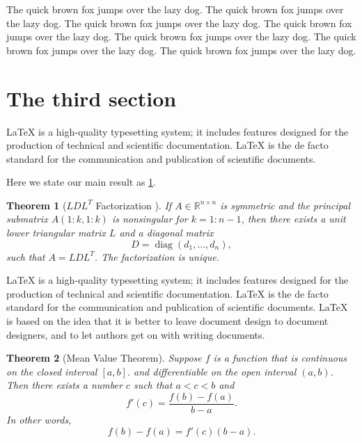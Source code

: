 \documentclass[openany,twoside,12pt]{book}
\theoremstyle{plain}
\newtheorem{theorem}{Theorem}[chapter]
\numberwithin{equation}{chapter}
\numberwithin{figure}{chapter}
\numberwithin{table}{chapter}
\begin{document}
The quick brown fox jumps over the lazy dog. The quick brown fox jumps over the lazy dog. The quick brown fox jumps over the lazy dog. The quick brown fox jumps over the lazy dog. The quick brown fox jumps over the lazy dog. The quick brown fox jumps over the lazy dog. The quick brown fox jumps over the lazy dog.


\section{The third section}
LaTeX is a high-quality typesetting system; it includes features designed for the production of technical and scientific documentation. LaTeX is the de facto standard for the communication and publication of scientific documents.

Here we state our main result as \ref{thm:bigthm}.

\begin{theorem}[$LDL^T$ Factorization \cite{GoVa2013}]\label{thm:bigthm}
  If $A \in \mathbb{R}^{n \times n}$ is symmetric and the principal
  submatrix $A(1:k,1:k)$ is nonsingular for $k=1:n-1$, then there
  exists a unit lower triangular matrix $L$ and a diagonal matrix
  \begin{equation*}
    D = \operatorname{diag}(d_1,\dots,d_n),  %
  \end{equation*}
  such that $A=LDL^T$. The factorization is unique.
\end{theorem}

LaTeX is a high-quality typesetting system; it includes features designed
for the production of technical and scientific documentation.
LaTeX is the de facto standard for the communication and publication of scientific documents.
LaTeX is based on the idea that it is better to leave document design to
document designers, and to let authors get on with writing documents.

\begin{theorem}[Mean Value Theorem]\label{thm:mvt}
  Suppose $f$ is a function that is continuous on the closed interval
  $[a,b]$.  and differentiable on the open interval $(a,b)$.
  Then there exists a number $c$ such that $a < c < b$ and
  \begin{equation*}
    f'(c) = \frac{f(b)-f(a)}{b-a}.
  \end{equation*}
  In other words,
  \begin{equation*}
    f(b)-f(a) = f'(c)(b-a).
  \end{equation*}
\end{theorem}
\end{document}
